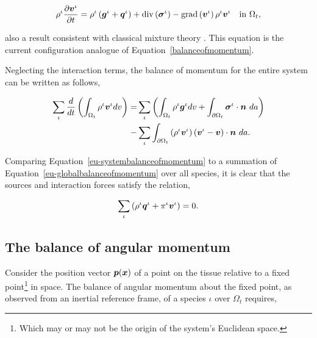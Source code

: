 \begin{equation}
\rho^{\iota} \frac{\partial \mbox{\boldmath$ v$}^{\iota}} {\partial t} = \rho^{\iota}
\left(\mbox{\boldmath$ g$}^{\iota}+\mbox{\boldmath$ q$}^{\iota}\right)  
+ \mathrm{div}\left(\mbox{\boldmath$\sigma$}^{\iota}\right)
- \mathrm{grad}\left(\mbox{\boldmath$ v$}^{\iota}\right) \rho^{\iota}\mbox{\boldmath$ v$}^{\iota}
\quad \mathrm{in}\ \Omega_{t},
\label{eu-localbalanceofmomentum}
\end{equation}

\noindent also a result consistent with classical mixture theory
\citep{TruesdellToupin:60}. This equation is the current configuration
analogue of Equation~\ref{balanceofmomentum}.

Neglecting the interaction terms, the balance of momentum for the
entire system can be written as follows,

\begin{equation}
\begin{split}
\sum\limits_{\iota} \frac{d}{dt}\left(\int_{\Omega_{t}} \rho^{\iota}
\mbox{\boldmath$ v$}^{\iota} dv 
\right) = & \sum\limits_{\iota} \left(\int_{\Omega_{t}} \rho^{\iota}
\mbox{\boldmath$ g$}^{\iota} dv + \int_{\partial \Omega_{t}} 
\mbox{\boldmath$\sigma$}^{\iota}\cdot\mbox{\boldmath$ n$}\ da\right)\\
- &\sum\limits_{\iota}\int_{\partial \Omega_{t}} \left(\rho^{\iota}
  \mbox{\boldmath$ v$}^{\iota} \right) \left(\mbox{\boldmath$ v$}^{\iota} -
\mbox{\boldmath$ v$}\right) \cdot \mbox{\boldmath$ n$}\ da.
\end{split}
\label{eu-systembalanceofmomentum}
\end{equation}

\noindent Comparing Equation~\ref{eu-systembalanceofmomentum} to a summation
of Equation~\ref{eu-globalbalanceofmomentum} over all species, it is clear
that the sources and interaction forces satisfy the relation,

\begin{equation}
\sum\limits_{\iota}\left( \rho^{\iota}\mbox{\boldmath$ q$}^{\iota} + \pi^{\iota}
\mbox{\boldmath$ v$}^{\iota} \right) = 0.
\label{eu-summationrelationmomentum}
\end{equation}

\subsection{The balance of angular momentum}
\label{eu-balance-of-angular-momentum}

Consider the position vector $\mbox{\boldmath$ p$}(\mbox{\boldmath$ x$})$ of a point on the tissue
relative to a fixed point\footnote{Which may or may not be
  the origin of the system's Euclidean space.} in space. The balance of angular
momentum about the fixed point, as observed from an inertial reference
frame, of a species $\iota$ over $\Omega_{t}$ requires,


